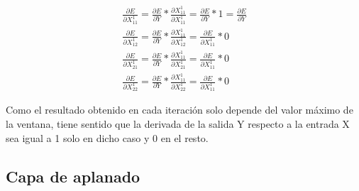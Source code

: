 \begin{gather}
	\frac{\partial E}{\partial X^1_{11}} = \frac{\partial E}{\partial Y} * \frac{\partial X^1_{11}}{\partial X^1_{11}} = \frac{\partial E}{\partial Y} * 1 = \frac{\partial E}{\partial Y} \\
	\frac{\partial E}{\partial X^1_{12}} = \frac{\partial E}{\partial Y} * \frac{\partial X^1_{11}}{\partial X^1_{12}} = \frac{\partial E}{\partial X^1_{11}} * 0 \\
	\frac{\partial E}{\partial X^1_{21}} = \frac{\partial E}{\partial Y} * \frac{\partial X^1_{11}}{\partial X^1_{21}} = \frac{\partial E}{\partial X^1_{11}} * 0 \\
	\frac{\partial E}{\partial X^1_{22}} = \frac{\partial E}{\partial Y} * \frac{\partial X^1_{11}}{\partial X^1_{22}} = \frac{\partial E}{\partial X^1_{11}} * 0
\end{gather}


 
Como el resultado obtenido en cada iteración solo depende del valor máximo de la ventana, tiene sentido que la derivada de la salida Y respecto a la entrada X sea igual a 1 solo en dicho caso y 0 en el resto. \cite{max_pool_backprop} \cite{max_pool_backprop_2}
\subsection{Capa de aplanado}

